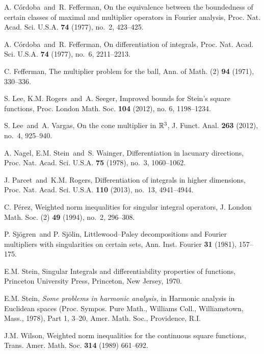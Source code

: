 \documentclass[11pt]{amsart}
\theoremstyle{definition}
\theoremstyle{remark}
\begin{document}
\begin{thebibliography}{99}
 A. C\'ordoba\ and\ R. Fefferman, On the equivalence between the boundedness of certain classes of maximal and multiplier operators in Fourier analysis, Proc. Nat. Acad. Sci. U.S.A. {\bf 74} (1977), no.~2, 423--425.

 A. C\'ordoba\ and\ R. Fefferman, On differentiation of integrals, Proc. Nat. Acad. Sci. U.S.A. {\bf 74} (1977), no.~6, 2211--2213.

 C. Fefferman, The multiplier problem for the ball, Ann. of Math. (2) {\bf 94} (1971), 330--336.

 S. Lee, K.M. Rogers\ and\ A. Seeger, Improved bounds for Stein's square functions,
Proc. London Math. Soc. {\bf 104} (2012), no. 6,  1198--1234.

 S. Lee\ and\ A. Vargas, On the cone multiplier in $\Bbb{R}\sp 3$, J. Funct. Anal. {\bf 263} (2012), no.~4, 925--940.

 A. Nagel, E.M. Stein\ and\ S. Wainger, Differentiation in lacunary directions, Proc. Nat. Acad. Sci. U.S.A. {\bf 75} (1978), no.~3, 1060--1062.

 J. Parcet\ and\ K.M. Rogers, Differentiation of integrals in higher dimensions, Proc. Nat. Acad. Sci. U.S.A. {\bf110} (2013),  no.~13, 4941--4944.

 C. P\'erez, Weighted norm inequalities for singular integral operators, J. London Math. Soc. (2) {\bf 49} (1994), no.~2, 296--308. 

 P. Sj\"ogren\ and P. Sj\"olin,  Littlewood--Paley decompositions and Fourier multipliers with singularities on certain sets, Ann. Inst. Fourier   {\bf 31} (1981), 157--175.

 E.M. Stein, Singular Integrals and differentiability properties of functions, Princeton University Press, Princeton, New Jersey, 1970.

E.M. Stein, \emph{Some problems in harmonic analysis,} in Harmonic analysis in Euclidean spaces (Proc. Sympos. Pure Math., Williams Coll., Williamstown, Mass., 1978), Part 1, 3--20, Amer. Math. Soc., Providence, R.I.

 J.M. Wilson, Weighted norm inequalities for the continuous square functions, Trans. Amer. Math. Soc. {\bf 314} (1989) 661--692.

\end{thebibliography}
\end{document}
